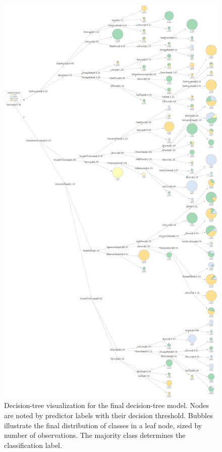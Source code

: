 \begin{figure}[!htp]
\centering
\includegraphics[height=0.85\textheight,keepaspectratio]{templates/images/Figure-DT_viz_portrait.pdf}
\caption[Decision tree visualization]{Decision-tree visualization for the final decision-tree model. Nodes are noted by predictor labels with their decision threshold. Bubbles illustrate the final distribution of classes in a leaf node, sized by number of observations. The majority class determines the classification label.}
\label{fig:dtree_viz}
\end{figure}

